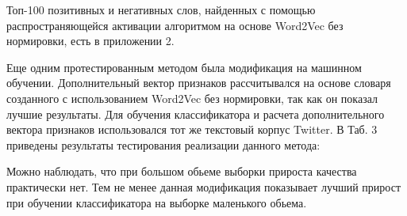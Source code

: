 
Топ-100 позитивных и негативных слов, найденных с помощью распространяющейся
активации алгоритмом на основе Word2Vec без нормировки, есть в приложении 2.

Еще одним протестированным методом была модификация на машинном обучении.
Дополнительный вектор признаков рассчитывался на основе словаря созданного
с использованием Word2Vec без нормировки, так как он показал лучшие результаты.
Для обучения классификатора и расчета дополнительного вектора признаков
использовался тот же текстовый корпус Twitter. В Таб. 3 приведены результаты
тестирования реализации данного метода:


Можно наблюдать, что при большом обьеме выборки прироста качества практически
нет. Тем не менее данная модификация показывает лучший прирост при
обучении классификатора на выборке маленького обьема.




\FloatBarrier

